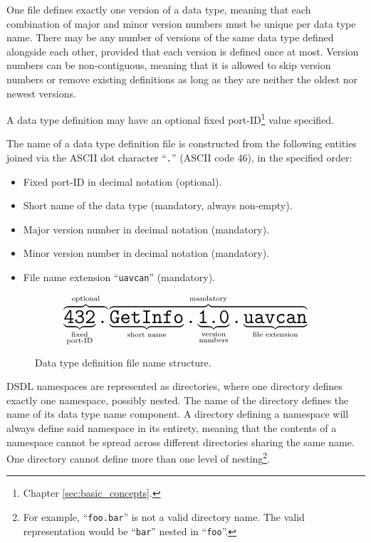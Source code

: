 One file defines exactly one version of a data type,
meaning that each combination of major and minor version numbers must be unique per data type name.
There may be any number of versions of the same data type defined alongside each other,
provided that each version is defined once at most.
Version numbers can be non-contiguous,
meaning that it is allowed to skip version numbers or remove existing definitions as long as they are neither the oldest nor newest versions.

A data type definition may have an optional fixed port-ID\footnote{Chapter \ref{sec:basic_concepts}.} value specified.

The name of a data type definition file is constructed from the following entities
joined via the ASCII dot character ``\verb|.|'' (ASCII code 46), in the specified order:
\begin{itemize}
    \item Fixed port-ID in decimal notation (optional).
    \item Short name of the data type (mandatory, always non-empty).
    \item Major version number in decimal notation (mandatory).
    \item Minor version number in decimal notation (mandatory).
    \item File name extension ``\verb|uavcan|'' (mandatory).
\end{itemize}

\begin{figure}[H]
    $$
    \overbrace{%
        \underbrace{\texttt{\huge{432}}}_{\substack{\text{fixed} \\ \text{port-ID}}}%
        \texttt{\huge{.}}%
    }^{\text{optional}}%
    \overbrace{%
        \underbrace{\texttt{\huge{GetInfo}}}_{\substack{\text{short name}}}%
        \texttt{\huge{.}}%
        \underbrace{\texttt{\huge{1.0}}}_{\substack{\text{version} \\ \text{numbers}}}%
        \texttt{\huge{.}}%
        \underbrace{\texttt{\huge{uavcan}}}_{\text{file extension}}%
    }^{\text{mandatory}}
    $$
    \caption{Data type definition file name structure.\label{fig:dsdl_definition_file_name_structure}}
\end{figure}

DSDL namespaces are represented as directories, where one directory defines exactly one namespace, possibly nested.
The name of the directory defines the name of its data type name component.
A directory defining a namespace will always define said namespace in its entirety,
meaning that the contents of a namespace cannot be spread across different directories sharing the same name.
One directory cannot define more than one level of
nesting\footnote{For example, ``\texttt{foo.bar}'' is not a valid directory name.
The valid representation would be ``\texttt{bar}'' nested in ``\texttt{foo}''.}.

